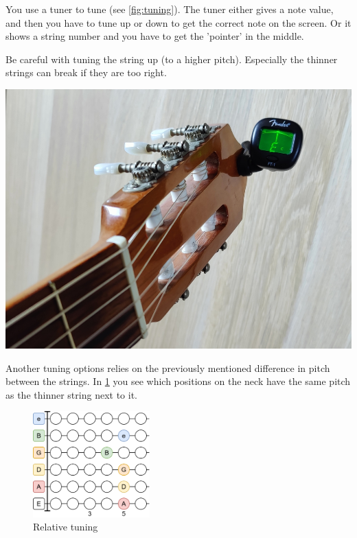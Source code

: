 \begin{minipage}{0.5\textwidth}
You use a tuner to tune (see \ref{fig:tuning}). The tuner either gives a note value, and then you have to tune up or down to get the correct note on the screen. Or it shows a string number and you have to get the 'pointer' in the middle.

Be careful with tuning the string up (to a higher pitch). Especially the thinner strings can break if they are too right.
\end{minipage}
\hfill
\begin{minipage}{0.3\textwidth}
    \centering
    \includegraphics[width=\textwidth]{../../Images/guitar-tuning.jpg}
    \label{fig:tuning}
\end{minipage}

Another tuning options relies on the previously mentioned difference in pitch between the strings. In \ref{fig:guitar_relative_tuning} you see which positions on the neck have the same pitch as the thinner string next to it.

\begin{figure}[h]
    \centering
    \includegraphics[width=0.4\textwidth]{../../Images/GuitarRelativeTuning.png}
    \caption{Relative tuning}
    \label{fig:guitar_relative_tuning}
\end{figure}
